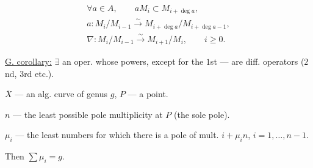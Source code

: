 \[
\begin{gathered}
\forall a\in A,\qquad aM_i\subset M_{i+\operatorname{deg}a},\\
a:M_i/M_{i-1}\overset{\sim}{\to}M_{i+\operatorname{deg}a}/M_{i+\operatorname{deg}a-1},\\
\nabla:M_i/M_{i-1}\overset{\sim}{\to}M_{i+1}/M_i,\qquad i\geqslant0.
\end{gathered}
\]

\underline{G. corollary:} \(\exists\) an oper. whose powers, except for the \(1\)st ---
are diff. operators (\(2\)nd, \(3\)rd etc.).

\(\overline X\) --- an alg. curve of genus \(g\), \(P\) --- a point.

\(n\) --- the least possible pole multiplicity at \(P\) (the sole pole).

\(\mu_i\) --- the least numbers for which there is a pole of mult. \(i+\mu_i n\), \(i=1,\ldots,n-1\).

Then \(\sum\mu_i=g\).


